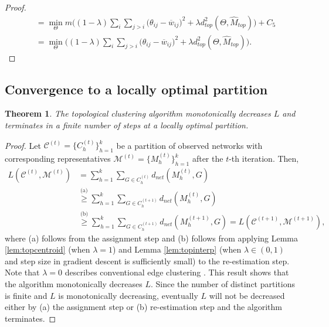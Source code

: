 \documentclass{article} %
\newtheorem{theorem}{Theorem}
\begin{document}
\begin{proof}
\begin{equation*}
\begin{split}
    &= \min_{\Theta} m \Big( (1-\lambda) \sum_{i}\sum_{j>i} \big(\theta_{ij} - \overline w_{ij} \big)^2 + \lambda d_{top}^2(\Theta, \widehat M_{top}) \Big) + C_5 \\
    &= \min_{\Theta} \Big( (1-\lambda) \sum_{i}\sum_{j>i} \big(\theta_{ij} - \overline w_{ij} \big)^2 + \lambda d_{top}^2(\Theta, \widehat M_{top}) \Big).
\end{split}
\end{equation*}
\end{proof}


\subsection{Convergence to a locally optimal partition}
\begin{theorem}
The topological clustering algorithm monotonically decreases $L$ and terminates in a finite number of steps at a locally optimal partition.
\end{theorem}

\begin{proof}
Let $\mathcal{C}^{(t)}=\{C_h^{(t)}\}_{h=1}^k$ be a partition of observed networks with corresponding representatives $\mathcal{M}^{(t)}=\{M_h^{(t)}\}_{h=1}^k$ after the $t$-th iteration. Then,
\begin{equation*}
\begin{split}
    L(\mathcal{C}^{(t)},\mathcal{M}^{(t)}) &= \sum_{h=1}^k \sum_{G \in C_h^{(t)}} d_{net}(M_h^{(t)},G) \\ 
    &\stackrel{\text{(a)}}{\geq} \sum_{h=1}^k \sum_{G \in C_h^{(t+1)}} d_{net}(M_h^{(t)},G) \\
    &\stackrel{\text{(b)}}{\geq} \sum_{h=1}^k \sum_{G \in C_h^{(t+1)}} d_{net}(M_h^{(t+1)},G) =  L(\mathcal{C}^{(t+1)},\mathcal{M}^{(t+1)}),
\end{split}
\end{equation*}
where (a) follows from the assignment step and
(b) follows from applying Lemma \ref{lem:topcentroid} (when $\lambda=1$) and Lemma \ref{lem:topinterp} (when $\lambda \in(0,1)$ and step size in gradient descent is sufficiently small) to the re-estimation step. Note that $\lambda=0$ describes conventional edge clustering \citep{macqueen1967some}. This result shows that the algorithm monotonically decreases $L$.
Since the number of distinct partitions is finite and $L$ is monotonically decreasing, eventually $L$ will not be decreased either by (a) the assignment step or (b) re-estimation step and the algorithm terminates.
\end{proof}
\end{document}
